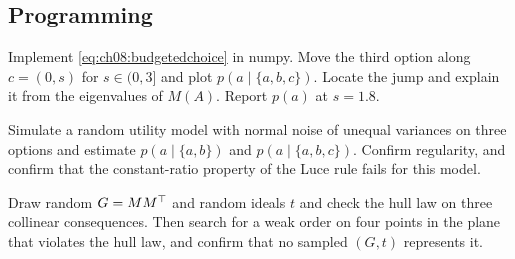 \subsection*{Programming}

\begin{exercise}\label{exr:ch08:code-decoy}
Implement \eqref{eq:ch08:budgetedchoice} in numpy. Move the third option along $c=(0,s)$ for $s\in(0,3]$ and plot $p(a\mid\{a,b,c\})$. Locate the jump and explain it from the eigenvalues of $M(A)$. Report $p(a)$ at $s=1.8$.
\end{exercise}

\begin{exercise}\label{exr:ch08:code-rum}
Simulate a random utility model with normal noise of unequal variances on three options and estimate $p(a\mid\{a,b\})$ and $p(a\mid\{a,b,c\})$. Confirm regularity, and confirm that the constant-ratio property of the Luce rule fails for this model.
\end{exercise}

\begin{exercise}\label{exr:ch08:code-hull}
Draw random $G=MM^{\top}$ and random ideals $t$ and check the hull law on three collinear consequences. Then search for a weak order on four points in the plane that violates the hull law, and confirm that no sampled $(G,t)$ represents it.
\end{exercise}

